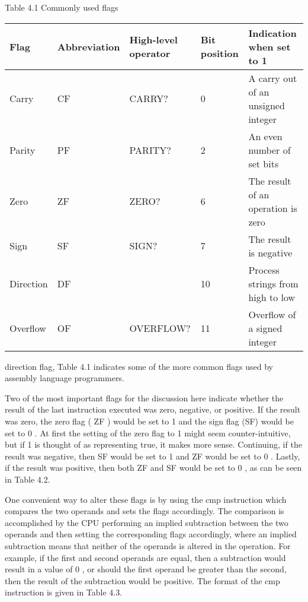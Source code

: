 \documentclass[10pt]{article}
\begin{document}
Table 4.1 Commonly used flags

\begin{center}
\begin{tabular}{|l|l|l|l|l|}
\hline
Flag & Abbreviation & High-level operator & Bit position & Indication when set to 1 \\
\hline
Carry & CF & CARRY? & 0 & A carry out of an unsigned integer \\
\hline
Parity & PF & PARITY? & 2 & An even number of set bits \\
\hline
Zero & ZF & ZERO? & 6 & The result of an operation is zero \\
\hline
Sign & SF & SIGN? & 7 & The result is negative \\
\hline
Direction & DF &  & 10 & Process strings from high to low \\
\hline
Overflow & OF & OVERFLOW? & 11 & Overflow of a signed integer \\
\hline
\end{tabular}
\end{center}

direction flag, Table 4.1 indicates some of the more common flags used by assembly language programmers.

Two of the most important flags for the discussion here indicate whether the result of the last instruction executed was zero, negative, or positive. If the result was zero, the zero flag ( ZF ) would be set to 1 and the sign flag (SF) would be set to 0 . At first the setting of the zero flag to 1 might seem counter-intuitive, but if 1 is thought of as representing true, it makes more sense. Continuing, if the result was negative, then SF would be set to 1 and ZF would be set to 0 . Lastly, if the result was positive, then both ZF and SF would be set to 0 , as can be seen in Table 4.2.

One convenient way to alter these flags is by using the cmp instruction which compares the two operands and sets the flags accordingly. The comparison is accomplished by the CPU performing an implied subtraction between the two operands and then setting the corresponding flags accordingly, where an implied subtraction means that neither of the operands is altered in the operation. For example, if the first and second operands are equal, then a subtraction would result in a value of 0 , or should the first operand be greater than the second, then the result of the subtraction would be positive. The format of the cmp instruction is given in Table 4.3.
\end{document}
